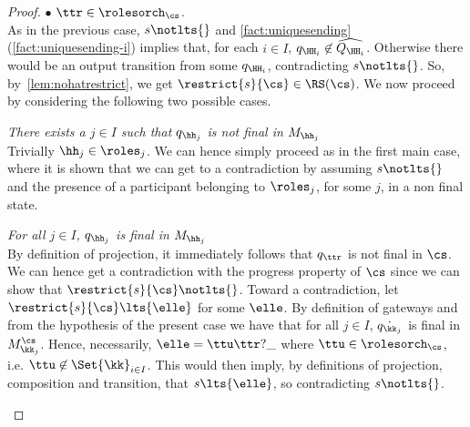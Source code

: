 \begin{proof}
$\bullet$ $\ttr\in\rolesorch_{\cs}$.\\
As in the previous case, $s\notlts{}$  and \cref{fact:uniquesending}(\ref{fact:uniquesending-i})
implies that, for each $i\in I$, $q_{\HH_i}\not\in\widehat{Q_{\HH_i}}$. Otherwise
there would be an output transition from some $q_{\HH_i}$, contradicting $s\notlts{}$.
So, by~\cref{lem:nohatrestrict}, we get $\restrict{s}{\cs}\in \RS(\cs)$.
We now proceed by considering the following two possible cases.
\begin{description}
\item
{\em There exists a $j\in I$ such that $q_{\hh_j}$ is not final in $M_{\hh_j}$}\\
Trivially $\hh_j\in\roles_j$. We can hence simply proceed as in the first main case, where it is shown that we can get to a contradiction by assuming $s\notlts{}$ and the 
presence of a participant belonging to $\roles_j$, for some $j$, in a non final state.  
 \item
{\em For all $j\in I$, $q_{\hh_j}$ is final in $M_{\hh_j}$}\\
By definition of projection, it immediately follows that $q_{\ttr}$ is not final in $\cs$.
We can hence get a contradiction with the progress property of $\cs$ since we can show that
$\restrict{s}{\cs}\notlts{}$. Toward a contradiction, let
$\restrict{s}{\cs}\lts{\elle}$ for some $\elle$. 
By definition of gateways and from the hypothesis of the present case 
we have that for all $j\in I$, $\dot{q_{\kk_j}}$ is final in $M^{\cs}_{\kk_j}$.
Hence, necessarily, $\elle=\ttu\ttr?\_$ where $\ttu\in\rolesorch_{\cs}$, i.e. 
$\ttu\not\in\Set{\kk}_{i\in I}$. 
This would then imply,  by definitions of projection, composition and transition,  that
$s\lts{\elle}$, so contradicting $s\notlts{}$.
\end{description}

\end{proof}


